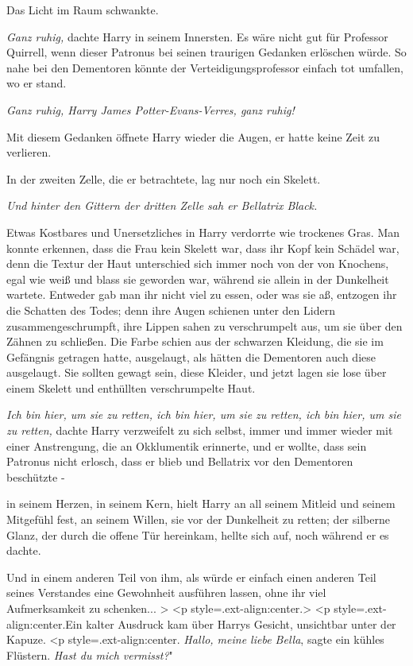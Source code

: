 Das Licht im Raum schwankte.

\emph{Ganz ruhig,} dachte Harry in seinem Innersten. Es wäre nicht gut für
Professor Quirrell, wenn dieser Patronus bei seinen traurigen Gedanken erlöschen
würde. So nahe bei den Dementoren könnte der Verteidigungsprofessor einfach tot
umfallen, wo er stand.

\emph{Ganz ruhig, Harry James Potter-Evans-Verres, ganz ruhig!}

Mit diesem Gedanken öffnete Harry wieder die Augen, er hatte keine Zeit zu
verlieren.

In der zweiten Zelle, die er betrachtete, lag nur noch ein Skelett.

\emph{Und hinter den Gittern der dritten Zelle sah er Bellatrix Black.}

Etwas Kostbares und Unersetzliches in Harry verdorrte wie trockenes Gras. Man
konnte erkennen, dass die Frau kein Skelett war, dass ihr Kopf kein Schädel war,
denn die Textur der Haut unterschied sich immer noch von der von Knochens, egal
wie weiß und blass sie geworden war, während sie allein in der Dunkelheit
wartete. Entweder gab man ihr nicht viel zu essen, oder was sie aß, entzogen ihr
die Schatten des Todes; denn ihre Augen schienen unter den Lidern
zusammengeschrumpft, ihre Lippen sahen zu verschrumpelt aus, um sie über den
Zähnen zu schließen. Die Farbe schien aus der schwarzen Kleidung, die sie im
Gefängnis getragen hatte, ausgelaugt, als hätten die Dementoren auch diese
ausgelaugt. Sie sollten gewagt sein, diese Kleider, und jetzt lagen sie lose
über einem Skelett und enthüllten verschrumpelte Haut.

\emph{Ich bin hier, um sie zu retten, ich bin hier, um sie zu retten, ich bin
hier, um sie zu retten,} dachte Harry verzweifelt zu sich selbst, immer und
immer wieder mit einer Anstrengung, die an Okklumentik erinnerte, und er wollte,
dass sein Patronus nicht erlosch, dass er blieb und Bellatrix vor den Dementoren
beschützte -

in seinem Herzen, in seinem Kern, hielt Harry an all seinem Mitleid und seinem
Mitgefühl fest, an seinem Willen, sie vor der Dunkelheit zu retten; der silberne
Glanz, der durch die offene Tür hereinkam, hellte sich auf, noch während er es
dachte.

Und in einem anderen Teil von ihm, als würde er einfach einen anderen Teil
seines Verstandes eine Gewohnheit ausführen lassen, ohne ihr viel Aufmerksamkeit
zu schenken...  > <p
style=\grqq{}.ext-align:center\grqq{}.> <p
style=\grqq{}.ext-align:center\grqq{}.Ein kalter Ausdruck kam über Harrys
Gesicht, unsichtbar unter der Kapuze.  <p
style=\grqq{}.ext-align:center\grqq{}. \glqq{}\emph{Hallo, meine liebe
Bella}\grqq{}, sagte ein kühles Flüstern. \glqq{}\emph{Hast du mich vermisst?}"



